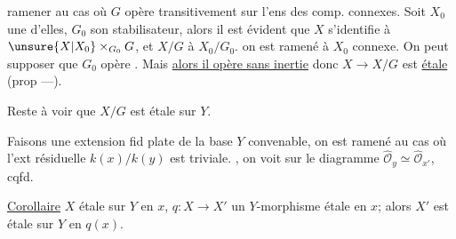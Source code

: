 ramener au cas où $G$ opère transitivement sur l'ens des comp. connexes.
Soit $X_0$  une d'elles, $G_0$ son stabilisateur, alors il est évident que $X$ s'identifie à $\unsure{X|X_0}\times_{G_0}G$, et $X/G$ à $X_0/G_0$.
 on est ramené à $X_0$ connexe.
On peut supposer que $G_0$ opère \uline{}.
Mais \uline{alors il opère sans inertie} donc $X\longrightarrow X/G$ est \uline{étale} (prop ---).

Reste à voir que $X/G$ est étale sur $Y$.

\margin{$*\quad\unsure{\prime}$}

Faisons une extension fid plate de la base $Y$ convenable, on est ramené au cas où l'ext résiduelle $k(x)/k(y)$ est triviale.
, on voit sur le diagramme $\widehat{\mathcal O}_y\simeq\widehat{\mathcal O}_{x'}$, cqfd.


\uline{Corollaire}
 $X$ étale sur $Y$ en $x$, $q:X\to X'$ un $Y$-morphisme étale en $x$; alors $X'$ est étale sur $Y$ en $q(x)$.

